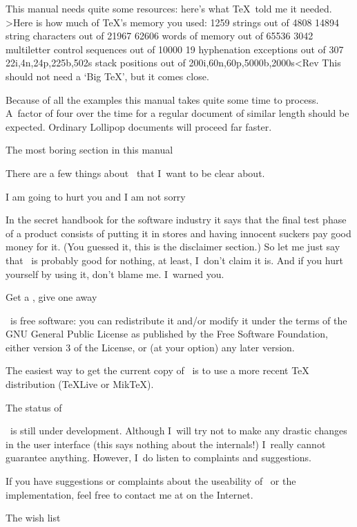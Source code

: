 This manual needs quite some resources: here's what \TeX\ told me
it needed.
\Ver>Here is how much of TeX's memory you used:
 1259 strings out of 4808
 14894 string characters out of 21967
 62606 words of memory out of 65536
 3042 multiletter control sequences out of 10000
 19 hyphenation exceptions out of 307
 22i,4n,24p,225b,502s stack positions out of 
 200i,60n,60p,5000b,2000s<Rev
This should not need a `Big \TeX', but it comes close.

Because of all the examples this manual takes quite some time to
process. A~factor of four over the time for a regular document of
similar length should be expected. Ordinary Lollipop documents will
proceed far faster.

\Section The most boring section in this manual

There are a few things about \Lollipop\ that I~want to be clear about.

\SubSection I am going to hurt you and I am not sorry

In the secret handbook for the software industry it says that the
final test phase of a product consists of putting it in stores and
having innocent suckers pay good money for it. (You guessed it, this
is the disclaimer section.) So let me just say that 
\Lollipop\ is probably good for nothing, at least, I~don't claim it
is. And if you hurt yourself by using it, don't blame me. I~warned
you.

\SubSection Get a \Lollipop, give one away

\Lollipop\ is free software: you can redistribute it and/or modify
it under the terms of the GNU General Public License as published by
the Free Software Foundation, either version 3 of the License, or
(at your option) any later version.

The easiest way to get the current copy of \Lollipop\ is to use
a more recent \TeX{} distribution (\TeX Live or Mik\TeX).

\SubSection The status of \Lollipop

\Lollipop\ is still under development. Although I~will try not to
make any drastic changes in the user interface (this says nothing
about the internals!) I~really cannot guarantee anything.
However, I~do listen to complaints and suggestions. 

If you have suggestions or complaints about the
useability of \Lollipop\ or the implementation, feel free to contact
me at  on the Internet. 

 The wish list

